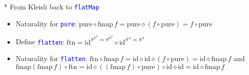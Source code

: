 \documentclass[english]{beamer}
\begin{document}
\begin{frame}{{*} From Kleisli back to \texttt{\textcolor{blue}{\footnotesize{}flatMap}} }
\begin{itemize}
\item Naturality for \texttt{\textcolor{blue}{\footnotesize{}pure}}: $\text{pure}\circ\text{fmap}\,f=\text{pure}\diamond\left(f\circ\text{pure}\right)=f\circ\text{pure}$
\item Define \texttt{\textcolor{blue}{\footnotesize{}flatten}}: $\text{ftn}=\text{id}^{S^{S^{A}}\Rightarrow S^{S^{A}}}\diamond\text{id}^{S^{A}\Rightarrow S^{A}}$
\item Naturality for \texttt{\textcolor{blue}{\footnotesize{}flatten}}:
$\text{ftn}\circ\text{fmap}\,f=\text{id}\diamond\text{id}\diamond\left(f\circ\text{pure}\right)=\text{id}\diamond\text{fmap}\,f$
and $\text{fmap}\left(\text{fmap}\,f\right)\circ\text{ftn}=\text{id}\diamond\left(\left(\text{fmap}\,f\right)\circ\text{pure}\right)\circ\text{id}\diamond\text{id}=\text{id}\diamond\text{fmap}\,f$
\end{itemize}
\end{frame}
\end{document}
